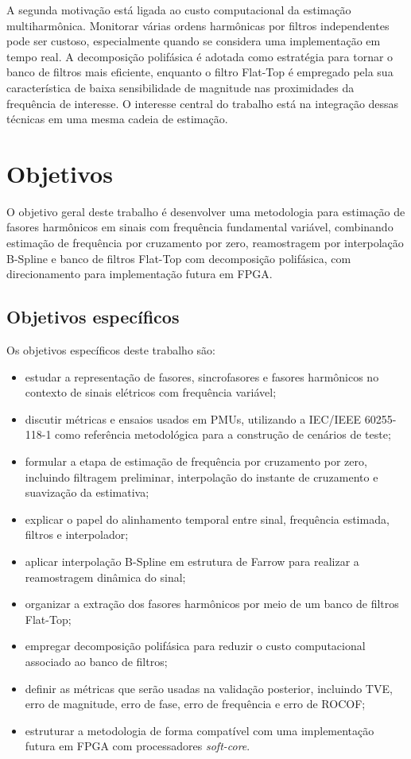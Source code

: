 A segunda motivação está ligada ao custo computacional da estimação multiharmônica. Monitorar várias ordens harmônicas por filtros independentes pode ser custoso, especialmente quando se considera uma implementação em tempo real. A decomposição polifásica é adotada como estratégia para tornar o banco de filtros mais eficiente, enquanto o filtro Flat-Top é empregado pela sua característica de baixa sensibilidade de magnitude nas proximidades da frequência de interesse. O interesse central do trabalho está na integração dessas técnicas em uma mesma cadeia de estimação.

\section{Objetivos}

O objetivo geral deste trabalho é desenvolver uma metodologia para estimação de fasores harmônicos em sinais com frequência fundamental variável, combinando estimação de frequência por cruzamento por zero, reamostragem por interpolação B-Spline e banco de filtros Flat-Top com decomposição polifásica, com direcionamento para implementação futura em FPGA.

\subsection{Objetivos específicos}

Os objetivos específicos deste trabalho são:

\begin{itemize}
    \item estudar a representação de fasores, sincrofasores e fasores harmônicos no contexto de sinais elétricos com frequência variável;
    \item discutir métricas e ensaios usados em PMUs, utilizando a IEC/IEEE 60255-118-1 como referência metodológica para a construção de cenários de teste;
    \item formular a etapa de estimação de frequência por cruzamento por zero, incluindo filtragem preliminar, interpolação do instante de cruzamento e suavização da estimativa;
    \item explicar o papel do alinhamento temporal entre sinal, frequência estimada, filtros e interpolador;
    \item aplicar interpolação B-Spline em estrutura de Farrow para realizar a reamostragem dinâmica do sinal;
    \item organizar a extração dos fasores harmônicos por meio de um banco de filtros Flat-Top;
    \item empregar decomposição polifásica para reduzir o custo computacional associado ao banco de filtros;
    \item definir as métricas que serão usadas na validação posterior, incluindo TVE, erro de magnitude, erro de fase, erro de frequência e erro de ROCOF;
    \item estruturar a metodologia de forma compatível com uma implementação futura em FPGA com processadores \textit{soft-core}.
\end{itemize}

